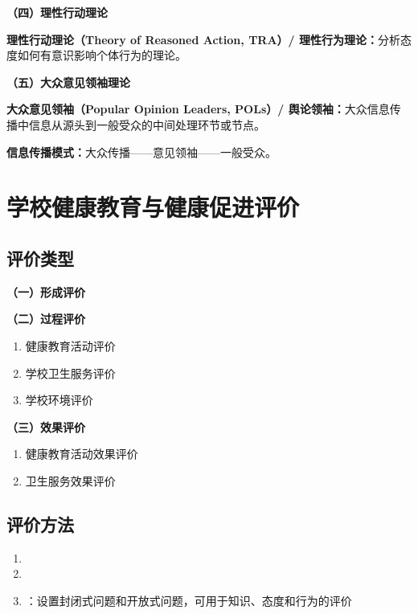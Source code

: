 \begin{defbox}
\textbf{（四）理性行动理论}

\textbf{理性行动理论（Theory of Reasoned Action, TRA）/ 理性行为理论：}分析态度如何有意识影响个体行为的理论。
\end{defbox}

\begin{defbox}
\textbf{（五）大众意见领袖理论}

\textbf{大众意见领袖（Popular Opinion Leaders, POLs）/ 舆论领袖：}大众信息传播中信息从源头到一般受众的中间处理环节或节点。

\textbf{信息传播模式：}大众传播——意见领袖——一般受众。
\end{defbox}

\section{学校健康教育与健康促进评价}

\subsection{评价类型}

\begin{defbox}
\textbf{（一）形成评价}

\textbf{（二）过程评价}
\begin{enumerate}[leftmargin=*]
    \item 健康教育活动评价
    \item 学校卫生服务评价
    \item 学校环境评价
\end{enumerate}

\textbf{（三）效果评价}
\begin{enumerate}[leftmargin=*]
    \item 健康教育活动效果评价
    \item 卫生服务效果评价
\end{enumerate}
\end{defbox}

\subsection{评价方法}

\begin{defbox}
\begin{enumerate}[leftmargin=*]
    \item {}
    \item {}
    \item {}：设置封闭式问题和开放式问题，可用于知识、态度和行为的评价
\end{enumerate}
\end{defbox}

